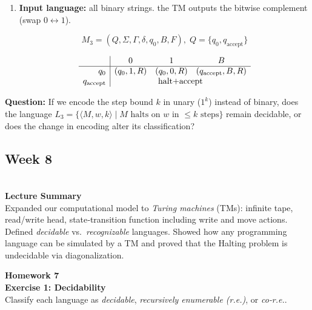 \documentclass{article}
\theoremstyle{theorem}
\theoremstyle{definition}
\theoremstyle{remark}
\begin{document}
\begin{enumerate}
  \item \textbf{Input language:} all binary strings. the TM outputs the bitwise complement (swap \(0\leftrightarrow1\)).

        \[
          M_3 = (Q,\Sigma,\Gamma,\delta,q_0,B,F),\;
          Q=\{q_0,q_{\mathrm{accept}}\}
        \]

        \[
        \begin{array}{r|ccc}
                 & 0          & 1          & B \\ \hline
        q_0      & (q_0,1,R)  & (q_0,0,R)  & (q_{\mathrm{accept}},B,R)\\
        q_{\mathrm{accept}} & \multicolumn{3}{c}{\text{halt+accept}}\\
        \end{array}
        \]
\end{enumerate}

    \textbf{Question: }If we encode the step bound \(k\) in unary (\(1^{k}\)) instead of binary, does the language  
        \(L_{3} = \{\langle M,w,k\rangle \mid M \text{ halts on } w \text{ in } \le k \text{ steps}\}\)  
        remain decidable, or does the change in encoding alter its classification?  






\subsection{Week 8}\\
\textbf{Lecture Summary}\\
Expanded our computational model to \emph{Turing machines} (TMs): infinite tape, read/write head, state‐transition function including write and move actions.  Defined \emph{decidable} vs.\ \emph{recognizable} languages.  Showed how any programming language can be simulated by a TM and proved that the Halting problem is undecidable via diagonalization.  


\textbf{Homework 7}\\
\textbf{Exercise 1: Decidability}\\
Classify each language as \emph{decidable}, \emph{recursively enumerable (r.e.)}, or \emph{co‑r.e.}. 
\end{document}
